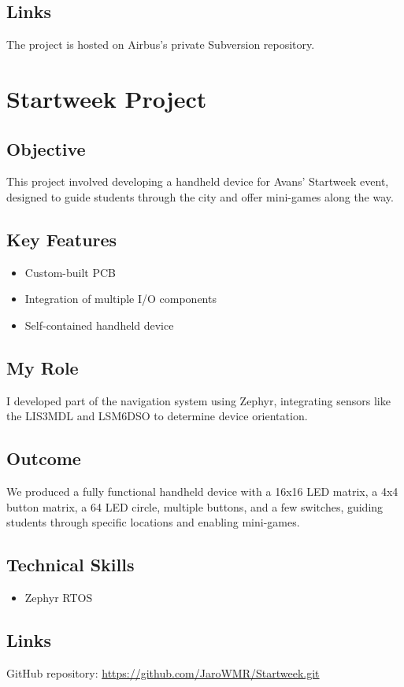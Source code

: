 \documentclass{article}
\begin{document}
\subsection{Links}
The project is hosted on Airbus's private Subversion repository.

\section{Startweek Project}
\subsection{Objective}
This project involved developing a handheld device for Avans' Startweek event, designed to guide students through the city and offer mini-games along the way.

\subsection{Key Features}
\begin{itemize}
    \item Custom-built PCB
    \item Integration of multiple I/O components
    \item Self-contained handheld device
\end{itemize}

\subsection{My Role}
I developed part of the navigation system using Zephyr, integrating sensors like the LIS3MDL and LSM6DSO to determine device orientation.

\subsection{Outcome}
We produced a fully functional handheld device with a 16x16 LED matrix, a 4x4 button matrix, a 64 LED circle, multiple buttons, and a few switches, guiding students through specific locations and enabling mini-games.

\subsection{Technical Skills}
\begin{itemize}
    \item Zephyr RTOS
\end{itemize}

\subsection{Links}
GitHub repository:
\url{https://github.com/JaroWMR/Startweek.git}
\end{document}
